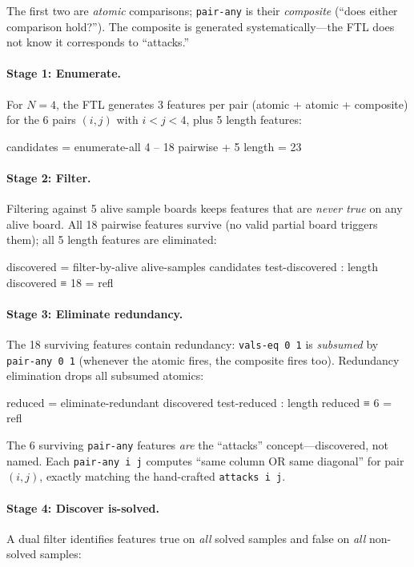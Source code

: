 The first two are \emph{atomic} comparisons; \texttt{pair-any} is their \emph{composite} (``does either comparison hold?'').  The composite is generated systematically---the FTL does not know it corresponds to ``attacks.''

\paragraph{Stage 1: Enumerate.}  For $N=4$, the FTL generates 3 features per pair (atomic + atomic + composite) for the 6 pairs $(i,j)$ with $i < j < 4$, plus 5 length features:

\begin{spec}
candidates = enumerate-all 4    -- 18 pairwise + 5 length = 23
\end{spec}

\paragraph{Stage 2: Filter.}  Filtering against 5 alive sample boards keeps features that are \emph{never true} on any alive board.
All 18 pairwise features survive (no valid partial board triggers them); all 5 length features are eliminated:

\begin{spec}
discovered = filter-by-alive alive-samples candidates
test-discovered : length discovered ≡ 18    = refl
\end{spec}

\paragraph{Stage 3: Eliminate redundancy.}  The 18 surviving features contain redundancy: \texttt{vals-eq~0~1} is \emph{subsumed} by \texttt{pair-any~0~1} (whenever the atomic fires, the composite fires too).  Redundancy elimination drops all subsumed atomics:

\begin{spec}
reduced = eliminate-redundant discovered
test-reduced : length reduced ≡ 6    = refl
\end{spec}

The 6 surviving \texttt{pair-any} features \emph{are} the ``attacks'' concept---discovered, not named.
Each \texttt{pair-any~i~j} computes ``same column OR same diagonal'' for pair $(i,j)$, exactly matching the hand-crafted \texttt{attacks~i~j}.

\paragraph{Stage 4: Discover is-solved.}  A dual filter identifies features true on \emph{all} solved samples and false on \emph{all} non-solved samples:


